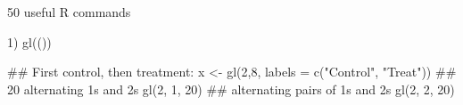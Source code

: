 

50 useful R commands

1) gl(())

## First control, then treatment:
x <- gl(2,8, labels = c("Control", "Treat"))
## 20 alternating 1s and 2s
gl(2, 1, 20)
## alternating pairs of 1s and 2s
gl(2, 2, 20)
